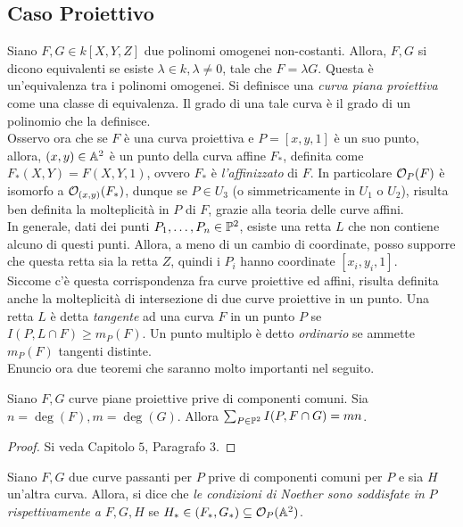         \subsection{Caso Proiettivo}
            Siano $F,G \in k[X,Y,Z]$ due polinomi omogenei non-costanti. Allora, $F,G$ si dicono equivalenti se esiste $\lambda \in k, \lambda \neq 0$, tale che $F = \lambda G$. Questa è un'equivalenza 
            tra i polinomi omogenei. Si definisce una \emph{curva piana proiettiva} come una classe di equivalenza. Il grado di una tale curva è il grado di un polinomio che la definisce.\\
            Osservo ora che se $F$ è una curva proiettiva e $P = [x,y,1]$ è un suo punto, allora, $(x,y) \in \A^2$ è un punto della curva affine $F_*$, definita come $F_*(X,Y) = F(X,Y,1)$, ovvero
            $F_*$ è \emph{l'affinizzato} di $F$. In particolare $\cO_P(F)$ è isomorfo a $\cO_{(x,y)}(F_*)$, dunque se $P \in U_3$ (o simmetricamente in $U_1$ o $U_2$), 
            risulta ben definita la molteplicità in $P$ di $F$, grazie alla teoria delle curve affini.\\
            In generale, dati dei punti $P_1,\ldots,P_n \in \P^2$, esiste una retta $L$ che non contiene alcuno di questi punti. Allora, a meno di un cambio di coordinate, posso supporre che questa retta 
            sia la retta $Z$, quindi i $P_i$ hanno coordinate $[x_i,y_i,1]$. \\
            Siccome c'è questa corrispondenza fra curve proiettive ed affini, risulta definita anche la molteplicità di intersezione di due curve proiettive in un punto. Una retta $L$ è detta \emph{tangente} 
            ad una curva $F$ in un punto $P$ se $I(P,L \cap F) \geq m_P(F)$. Un punto multiplo è detto \emph{ordinario} se ammette $m_P(F)$ tangenti distinte.\\
            \noindent
            Enuncio ora due teoremi che saranno molto importanti nel seguito. \\
            \begin{teorema}[di Bezout]
                Siano $F,G$ curve piane proiettive prive di componenti comuni. Sia $n = \deg(F), m = \deg(G)$. Allora $\sum_{P \in \P^2}I(P,F \cap G) = mn$.
            \end{teorema}
            \begin{proof}
                Si veda \cite{fulton} Capitolo $5$, Paragrafo $3$.
            \end{proof}
            \begin{definizione}
                Siano $F,G$ due curve passanti per $P$ prive di componenti comuni per $P$ e sia $H$ un'altra curva. Allora, si dice che \emph{le condizioni di Noether sono soddisfate in }$P$ 
                \emph{rispettivamente a} $F,G,H$ se $H_* \in (F_*,G_*) \subseteq \cO_P(\A^2)$.
            \end{definizione}
